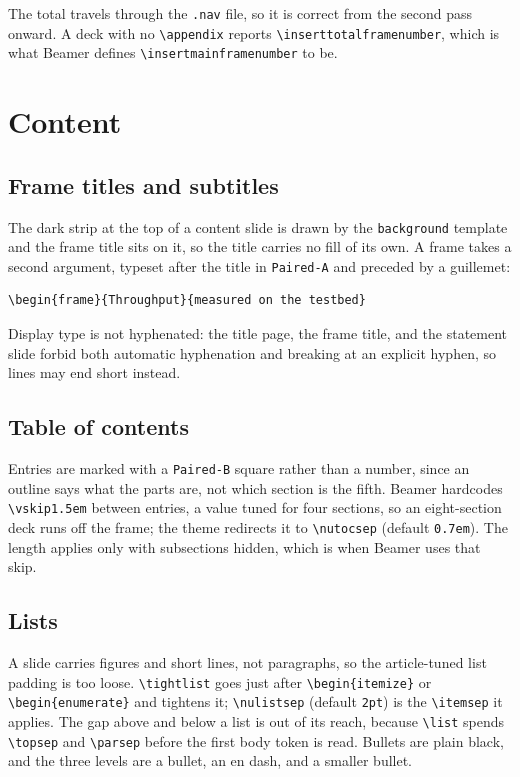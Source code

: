 \documentclass[a4paper,11pt]{article}
\begin{document}
The total travels through the \texttt{.nav} file, so it is correct from the
second pass onward.  A deck with no \verb|\appendix| reports
\verb|\inserttotalframenumber|, which is what Beamer defines
\verb|\insertmainframenumber| to be.

\section{Content}

\subsection{Frame titles and subtitles}

The dark strip at the top of a content slide is drawn by the
\texttt{background} template and the frame title sits on it, so the title
carries no fill of its own.  A frame takes a second argument, typeset after the
title in \texttt{Paired-A} and preceded by a guillemet:

\begin{lstlisting}
\begin{frame}{Throughput}{measured on the testbed}
\end{lstlisting}

Display type is not hyphenated: the title page, the frame title, and the
statement slide forbid both automatic hyphenation and breaking at an explicit
hyphen, so lines may end short instead.

\subsection{Table of contents}

Entries are marked with a \texttt{Paired-B} square rather than a number, since
an outline says what the parts are, not which section is the fifth.  Beamer
hardcodes \verb|\vskip1.5em| between entries, a value tuned for four sections,
so an eight-section deck runs off the frame; the theme redirects it to
\verb|\nutocsep| (default \texttt{0.7em}).  The length applies only with
subsections hidden, which is when Beamer uses that skip.

\subsection{Lists}

A slide carries figures and short lines, not paragraphs, so the article-tuned
list padding is too loose.  \verb|\tightlist| goes just after
\verb|\begin{itemize}| or \verb|\begin{enumerate}| and tightens it;
\verb|\nulistsep| (default \texttt{2pt}) is the \verb|\itemsep| it applies.
The gap above and below a list is out of its reach, because \verb|\list| spends
\verb|\topsep| and \verb|\parsep| before the first body token is read.
Bullets are plain black, and the three levels are a bullet, an en dash, and a
smaller bullet.
\end{document}
